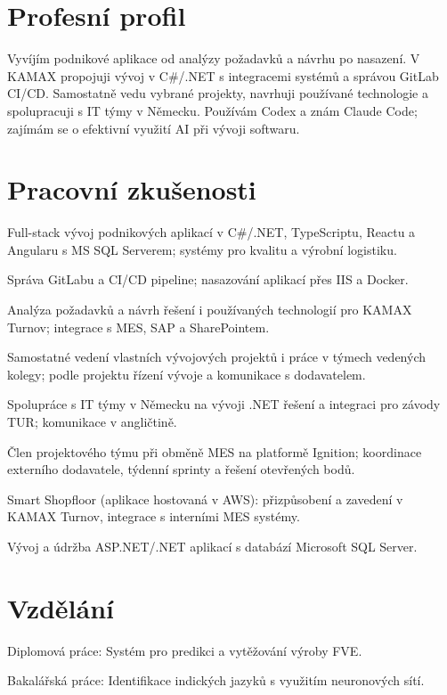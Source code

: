 \section{Profesní profil}
Vyvíjím podnikové aplikace od analýzy požadavků a návrhu po nasazení. V KAMAX propojuji vývoj v C\#/.NET s integracemi systémů a správou GitLab CI/CD. Samostatně vedu vybrané projekty, navrhuji používané technologie a spolupracuji s IT týmy v Německu. Používám Codex a znám Claude Code; zajímám se o efektivní využití AI při vývoji softwaru.

\section{Pracovní zkušenosti}
\begin{highlights}
  \item Full-stack vývoj podnikových aplikací v C\#/.NET, TypeScriptu, Reactu a Angularu s MS SQL Serverem; systémy pro kvalitu a výrobní logistiku.
  \item Správa GitLabu a CI/CD pipeline; nasazování aplikací přes IIS a Docker.
  \item Analýza požadavků a návrh řešení i používaných technologií pro KAMAX Turnov; integrace s MES, SAP a SharePointem.
  \item Samostatné vedení vlastních vývojových projektů i práce v týmech vedených kolegy; podle projektu řízení vývoje a komunikace s dodavatelem.
  \item Spolupráce s IT týmy v Německu na vývoji .NET řešení a integraci pro závody TUR; komunikace v angličtině.
  \item Člen projektového týmu při obměně MES na platformě Ignition; koordinace externího dodavatele, týdenní sprinty a řešení otevřených bodů.
  \item Smart Shopfloor (aplikace hostovaná v AWS): přizpůsobení a zavedení v KAMAX Turnov, integrace s interními MES systémy.
\end{highlights}

\vspace{5pt}
\begin{highlights}
  \item Vývoj a údržba ASP.NET/.NET aplikací s databází Microsoft SQL Server.
\end{highlights}

\section{Vzdělání}
{\small Diplomová práce: Systém pro predikci a vytěžování výroby FVE.}\par
\vspace{7pt}
{\small Bakalářská práce: Identifikace indických jazyků s využitím neuronových sítí.}\par


